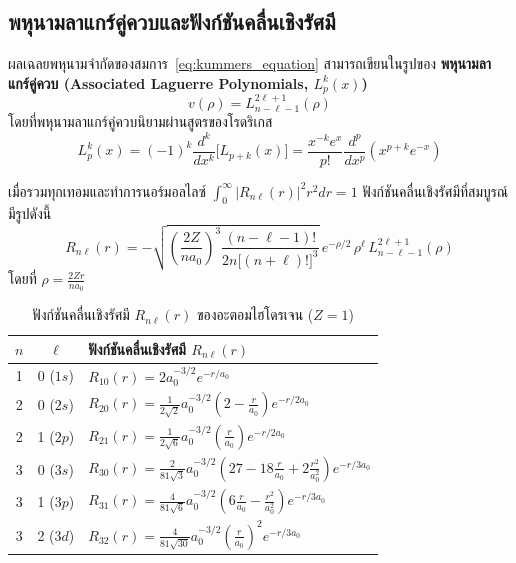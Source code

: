 \subsection{พหุนามลาแกร์คู่ควบและฟังก์ชันคลื่นเชิงรัศมี}
ผลเฉลยพหุนามจำกัดของสมการ~\eqref{eq:kummers_equation} สามารถเขียนในรูปของ \textbf{พหุนามลาแกร์คู่ควบ (Associated Laguerre Polynomials, $L_p^k(x)$)}
\begin{equation}
v(\rho) = L_{n - \ell - 1}^{2\ell + 1}(\rho)
\end{equation}
โดยที่พหุนามลาแกร์คู่ควบนิยามผ่านสูตรของโรดริเกส
\begin{equation}
L_p^k(x) = (-1)^k \frac{d^k}{dx^k} \big[ L_{p+k}(x) \big] = \frac{x^{-k} e^x}{p!} \frac{d^p}{dx^p}\left( x^{p+k} e^{-x} \right)
\end{equation}

เมื่อรวมทุกเทอมและทำการนอร์มอลไลซ์ $\int_0^\infty |R_{n\ell}(r)|^2 r^2 dr = 1$ ฟังก์ชันคลื่นเชิงรัศมีที่สมบูรณ์มีรูปดังนี้
\begin{equation}
R_{n\ell}(r) = -\sqrt{\left(\frac{2Z}{n a_0}\right)^3 \frac{(n - \ell - 1)!}{2n \big[(n + \ell)!\big]^3}} \, e^{-\rho/2} \, \rho^\ell \, L_{n - \ell - 1}^{2\ell + 1}(\rho)
\label{eq:radial_wavefunction_general}
\end{equation}
โดยที่ $\rho = \frac{2Z r}{n a_0}$

\begin{table}[H]
\centering
\caption{ฟังก์ชันคลื่นเชิงรัศมี $R_{n\ell}(r)$ ของอะตอมไฮโดรเจน ($Z = 1$)}
\label{tab:radial_wavefunctions}
\begin{tabular}{ccl}
\hline
$n$ & $\ell$ & ฟังก์ชันคลื่นเชิงรัศมี $R_{n\ell}(r)$ \\
\hline
1 & 0 ($1s$) & $R_{10}(r) = 2 a_0^{-3/2} e^{-r/a_0}$ \\[6pt]
2 & 0 ($2s$) & $R_{20}(r) = \frac{1}{2\sqrt{2}} a_0^{-3/2} \left( 2 - \frac{r}{a_0} \right) e^{-r/2a_0}$ \\[6pt]
2 & 1 ($2p$) & $R_{21}(r) = \frac{1}{2\sqrt{6}} a_0^{-3/2} \left( \frac{r}{a_0} \right) e^{-r/2a_0}$ \\[6pt]
3 & 0 ($3s$) & $R_{30}(r) = \frac{2}{81\sqrt{3}} a_0^{-3/2} \left( 27 - 18\frac{r}{a_0} + 2\frac{r^2}{a_0^2} \right) e^{-r/3a_0}$ \\[6pt]
3 & 1 ($3p$) & $R_{31}(r) = \frac{4}{81\sqrt{6}} a_0^{-3/2} \left( 6\frac{r}{a_0} - \frac{r^2}{a_0^2} \right) e^{-r/3a_0}$ \\[6pt]
3 & 2 ($3d$) & $R_{32}(r) = \frac{4}{81\sqrt{30}} a_0^{-3/2} \left( \frac{r}{a_0} \right)^2 e^{-r/3a_0}$ \\
\hline
\end{tabular}
\end{table}


